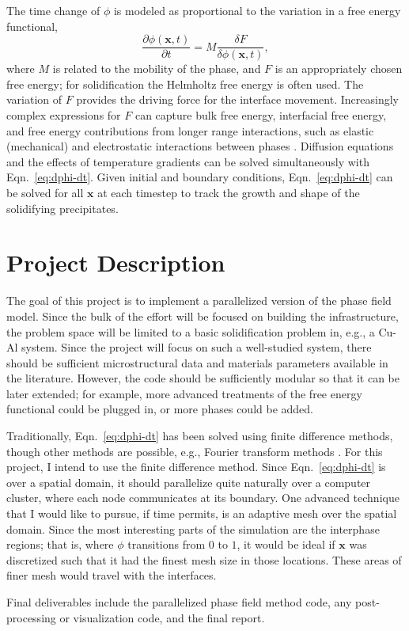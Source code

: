 \documentclass{article}
\renewcommand\vec[1]{\bm{#1}}
\begin{document}
  The time change of $\phi$ is modeled as proportional to the
  variation in a free energy functional,
  \begin{equation}
    \frac{\partial \phi(\vec{x}, t)}{\partial t} =
    M \frac{\delta F}{\delta \phi(\vec{x}, t)},
    \label{eq:dphi-dt}
  \end{equation}
  where $M$ is related to the mobility of the phase, and $F$ is an
  appropriately chosen free energy; for solidification the Helmholtz
  free energy is often used. The variation of $F$ provides the driving
  force for the interface movement. Increasingly complex expressions
  for $F$ can capture bulk free energy, interfacial free energy, and
  free energy contributions from longer range interactions, such as
  elastic (mechanical) and electrostatic interactions between phases
  \cite{Chen2002}. Diffusion equations and the effects of temperature
  gradients can be solved simultaneously with Eqn.~\eqref{eq:dphi-dt}.
  Given initial and boundary conditions, Eqn.~\eqref{eq:dphi-dt} can
  be solved for all $\vec x$ at each timestep to track the growth and
  shape of the solidifying precipitates.

  \section{Project Description}
  \label{sec:project_description}

  The goal of this project is to implement a parallelized version of
  the phase field model. Since the bulk of the effort will be focused
  on building the infrastructure, the problem space will be limited to
  a basic solidification problem in, e.g., a Cu-Al system. Since the
  project will focus on such a well-studied system, there should be
  sufficient microstructural data and materials parameters available
  in the literature. However, the code should be sufficiently modular
  so that it can be later extended; for example, more advanced
  treatments of the free energy functional could be plugged in, or
  more phases could be added.

  Traditionally, Eqn.~\eqref{eq:dphi-dt} has been solved using finite
  difference methods, though other methods are possible, e.g., Fourier
  transform methods \cite{Chen2002}. For this project, I intend to use
  the finite difference method. Since Eqn.~\eqref{eq:dphi-dt} is over
  a spatial domain, it should parallelize quite naturally over a
  computer cluster, where each node communicates at its boundary. One
  advanced technique that I would like to pursue, if time permits, is
  an adaptive mesh over the spatial domain. Since the most interesting
  parts of the simulation are the interphase regions; that is,
  where $\phi$ transitions from $0$ to $1$, it would be ideal if $\vec
  x$ was discretized such that it had the finest mesh size in those
  locations. These areas of finer mesh would travel with the
  interfaces.

  Final deliverables include the parallelized phase field method code,
  any post-processing or visualization code, and the final report.

  
  
\end{document}

